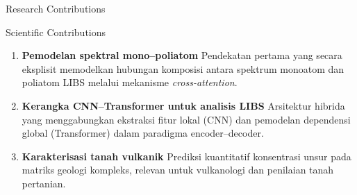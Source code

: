 \documentclass{beamer}
\def\\{}%
\begin{document}
\begin{frame}{Research Contributions}
  \begin{block}{Scientific Contributions}
    \begin{enumerate}\setlength{\itemsep}{8pt}
      \item \textbf{Pemodelan spektral mono--poliatom}\\
      {\small Pendekatan pertama yang secara eksplisit memodelkan hubungan komposisi antara spektrum monoatom dan poliatom LIBS melalui mekanisme \textit{cross-attention}.}

      \item \textbf{Kerangka CNN--Transformer untuk analisis LIBS}\\
      {\small Arsitektur hibrida yang menggabungkan ekstraksi fitur lokal (CNN) dan pemodelan dependensi global (Transformer) dalam paradigma encoder--decoder.}

      \item \textbf{Karakterisasi tanah vulkanik}\\
      {\small Prediksi kuantitatif konsentrasi unsur pada matriks geologi kompleks, relevan untuk vulkanologi dan penilaian tanah pertanian.}
    \end{enumerate}
  \end{block}
\end{frame}
\end{document}
